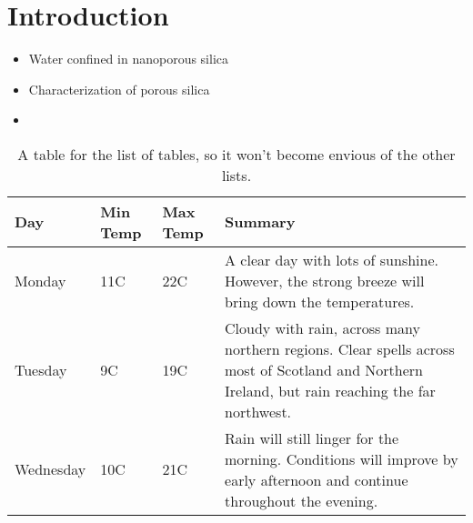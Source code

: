 \chapter*{Introduction}
\begin{itemize}
    \item Water confined in nanoporous silica
    \item Characterization of porous silica
    \item 
\end{itemize}

\begin{center}
\begin{table}
    \begin{tabular}{ | l | l | l | p{5cm} |}
    \hline
    Day & Min Temp & Max Temp & Summary \\ \hline
    Monday & 11C & 22C & A clear day with lots of sunshine.  
    However, the strong breeze will bring down the temperatures. \\ \hline
    Tuesday & 9C & 19C & Cloudy with rain, across many northern regions. Clear spells
    across most of Scotland and Northern Ireland,
    but rain reaching the far northwest. \\ \hline
    Wednesday & 10C & 21C & Rain will still linger for the morning.
    Conditions will improve by early afternoon and continue
    throughout the evening. \\
    \hline
    \end{tabular}
\caption{A table for the list of tables, so it won't become envious of the other lists.}
\end{table}
\end{center}
